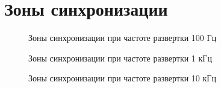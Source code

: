 \section{Зоны синхронизации}
\begin{figure}[H]
	\centering
	\begin{tikzpicture}
	\hspace{-1cm}
				
	\end{tikzpicture}
	\caption{Зоны синхронизации при частоте развертки 100 Гц}
	\label{fig:regions-100}
\end{figure}
\begin{figure}[H]
	\centering
	\begin{tikzpicture}
	\hspace{-1cm}
				
	\end{tikzpicture}
	\caption{Зоны синхронизации при частоте развертки 1 кГц}
	\label{fig:regions-1000}
\end{figure}
\begin{figure}[H]
	\centering
	\begin{tikzpicture}
	\hspace{-1cm}
				
	\end{tikzpicture}
	\caption{Зоны синхронизации при частоте развертки 10 кГц}
	\label{fig:regions-10000}
\end{figure}